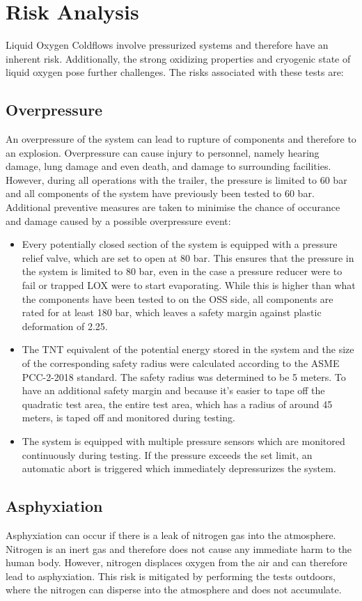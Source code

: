 \documentclass{article}
\begin{document}
\section{Risk Analysis}
Liquid Oxygen Coldflows involve pressurized systems and therefore have an inherent risk. Additionally, the strong oxidizing properties and cryogenic state of liquid oxygen pose further challenges. The risks associated with these tests are:
\subsection{Overpressure}
An overpressure of the system can lead to rupture of components and therefore to an explosion. Overpressure can cause injury to personnel, namely hearing damage, lung damage and even death, and damage to surrounding facilities. However, during all operations with the trailer, the pressure is limited to 60 bar and all components of the system have previously been tested to 60 bar. Additional preventive measures are taken to minimise the chance of occurance and damage caused by a possible overpressure event:
\begin{itemize}
    \item Every potentially closed section of the system is equipped with a pressure relief valve, which are set to open at 80 bar. This ensures that the pressure in the system is limited to 80 bar, even in the case a pressure reducer were to fail or trapped LOX were to start evaporating. While this is higher than what the components have been tested to on the OSS side, all components are rated for at least 180 bar, which leaves a safety margin against plastic deformation of 2.25.
    \item The TNT equivalent of the potential energy stored in the system and the size of the corresponding safety radius were calculated according to the ASME PCC-2-2018 standard. The safety radius was determined to be 5 meters. To have an additional safety margin and because it's easier to tape off the quadratic test area, the entire test area, which has a radius of around 45 meters, is taped off and monitored during testing.
    \item The system is equipped with multiple pressure sensors which are monitored continuously during testing. If the pressure exceeds the set limit, an automatic abort is triggered which immediately depressurizes the system.
\end{itemize}
\subsection{Asphyxiation}
Asphyxiation can occur if there is a leak of nitrogen gas into the atmosphere. Nitrogen is an inert gas and therefore does not cause any immediate harm to the human body. However, nitrogen displaces oxygen from the air and can therefore lead to asphyxiation. This risk is mitigated by performing the tests outdoors, where the nitrogen can disperse into the atmosphere and does not accumulate.
\end{document}
